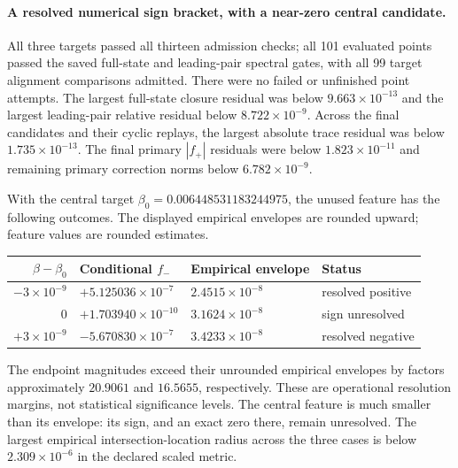 \documentclass[11pt,letterpaper]{article}
\begin{document}
\paragraph{A resolved numerical sign bracket, with a near-zero central candidate.}
All three targets passed all thirteen admission checks; all 101 evaluated points passed the saved
full-state and leading-pair spectral gates, with all 99 target alignment comparisons admitted.
There were no failed or unfinished point attempts. The largest full-state closure residual was below
$9.663\times10^{-13}$ and the largest leading-pair relative residual below $8.722\times10^{-9}$.
Across the final candidates and their cyclic replays, the largest absolute trace residual was below
$1.735\times10^{-13}$. The final primary $|f_+|$ residuals were below $1.823\times10^{-11}$ and
remaining primary correction norms below $6.782\times10^{-9}$.

With the central target $\beta_0=0.006448531183244975$, the unused feature has the following outcomes.
The displayed empirical envelopes are rounded upward; feature values are rounded estimates.
\begin{center}
\small
\begin{tabular}{rlll}
\hline
$\beta-\beta_0$ & Conditional $f_-$ & Empirical envelope & Status \\
\hline
$-3\times10^{-9}$ & $+5.125036\times10^{-7}$ & $2.4515\times10^{-8}$ & resolved positive \\
$0$ & $+1.703940\times10^{-10}$ & $3.1624\times10^{-8}$ & sign unresolved \\
$+3\times10^{-9}$ & $-5.670830\times10^{-7}$ & $3.4233\times10^{-8}$ & resolved negative \\
\hline
\end{tabular}
\end{center}
The endpoint magnitudes exceed their unrounded empirical envelopes by factors approximately
$20.9061$ and $16.5655$, respectively. These are operational resolution margins, not statistical
significance levels. The central feature is much smaller than its envelope: its sign, and an exact
zero there, remain unresolved. The largest empirical intersection-location radius across the three
cases is below $2.309\times10^{-6}$ in the declared scaled metric.
\end{document}

